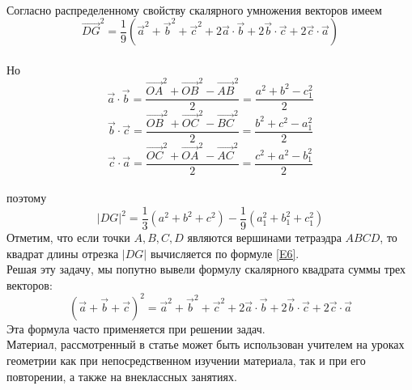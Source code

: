 \documentclass{article}
\begin{document}
\\Согласно распределенному свойству скалярного умножения векторов имеем 
$$\overrightarrow{DG}^2=\frac{1}{9}(\overrightarrow{a}^2+\overrightarrow{b}^2+\overrightarrow{c}^2+2\overrightarrow{a}\cdot\overrightarrow{b}+2\overrightarrow{b}\cdot\overrightarrow{c}+2\overrightarrow{c}\cdot\overrightarrow{a})$$
\\Но
$$\overrightarrow{a}\cdot\overrightarrow{b}=\frac{\overrightarrow{OA}^2+\overrightarrow{OB}^2-\overrightarrow{AB}^2}{2}=\frac{a^2+b^2-c_1^2}{2}$$
$$\overrightarrow{b}\cdot\overrightarrow{c}=\frac{\overrightarrow{OB}^2+\overrightarrow{OC}^2-\overrightarrow{BC}^2}{2}=\frac{b^2+c^2-a_1^2}{2}$$
$$\overrightarrow{c}\cdot\overrightarrow{a}=\frac{\overrightarrow{OC}^2+\overrightarrow{OA}^2-\overrightarrow{AC}^2}{2}=\frac{c^2+a^2-b_1^2}{2}$$
\\поэтому
\begin{equation}\label{E6}
|DG|^2=\frac{1}{3}(a^2+b^2+c^2)-\frac{1}{9}(a_1^2+b_1^2+c_1^2)
\end{equation}
Отметим, что если точки $A,B,C,D$ являются вершинами тетраэдра $ABCD$, то квадрат длины отрезка $|DG|$ вычисляется по формуле \eqref{E6}.
\\Решая эту задачу, мы попутно вывели формулу скалярного квадрата суммы трех векторов:
$$(\overrightarrow{a}+\overrightarrow{b}+\overrightarrow{c})^2=\overrightarrow{a}^2+\overrightarrow{b}^2+\overrightarrow{c}^2+2\overrightarrow{a}\cdot\overrightarrow{b}+2\overrightarrow{b}\cdot\overrightarrow{c}+2\overrightarrow{c}\cdot\overrightarrow{a}$$
Эта формула часто применяется при решении задач.
\\Материал, рассмотренный в статье может быть использован учителем на уроках геометрии как при непосредственном изучении материала, так и при его повторении, а также на внеклассных занятиях.
\end{document}
